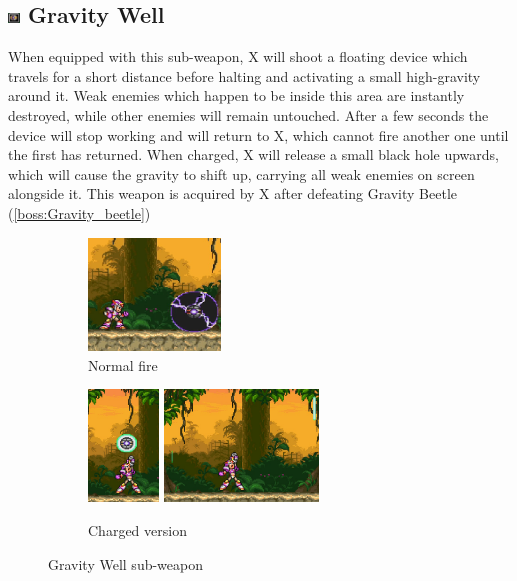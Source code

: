 \subsection{\includegraphics[width=12px, height=10px]{figures/X3/weapons/G_well.jpg} Gravity Well}\label{Gravity_Well}
When equipped with this sub-weapon, X will shoot a floating device which travels for a short distance before halting and activating a small high-gravity around it. Weak enemies which happen to be inside this area are instantly destroyed, while other enemies will remain untouched. After a few seconds the device will stop working and will return to X, which cannot fire another one until the first has returned. When charged, X will release a small black hole upwards, which will cause the gravity to shift up, carrying all weak enemies on screen alongside it. This weapon is acquired by X after defeating Gravity Beetle (\ref{boss:Gravity_beetle})
\begin{figure}[htp]
	\centering
	\begin{subfigure}{.25\linewidth}
		\centering
		\includegraphics[height=3cm]{figures/X3/weapons/G_well.png}
		\caption{Normal fire}	
	\end{subfigure}
	\begin{subfigure}{.6\linewidth}
		\centering
		\includegraphics[height=3cm]{figures/X3/weapons/G_well_C.png}
		\includegraphics[height=3cm]{figures/X3/weapons/G_well_C_1.png}
		\caption{Charged version}	
	\end{subfigure}
	\caption{Gravity Well sub-weapon}
\end{figure}

